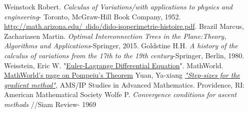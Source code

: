 \documentclass[10pt,a4paper]{article}%
\theoremstyle{theorem}
\theoremstyle{definition}
\begin{document}
\begin{thebibliography}{9}
	 Weinstock Robert. \textit{Calculus of Variations/with applications to physics and engineering}- Toronto, McGraw-Hill Book Company, 1952.
	 \href{http://math.arizona.edu/~dido/dido-isoperimetrie-histoire.pdf}{http://math.arizona.edu/~dido/dido-isoperimetrie-histoire.pdf}.
	 Brazil Marcus, Zachariasen Martin. \textit{Optimal Interconnection Trees in the Plane:Theory, Algorithms and Applications}-Springer, 2015. 
	 Goldstine H.H. \textit{A history of the calculus of variations from the 17th to the	19th century}-Springer, Berlin, 1980.
	 Weisstein, Eric W. "\href{http://mathworld.wolfram.com/Euler-LagrangeDifferentialEquation.html}{Euler-Lagrange Differential Equation}". MathWorld.
	 \href{http://mathworld.wolfram.com/PompeiusTheorem.html}{MathWorld's page on Pompeiu's Theorem}
	 Yuan, Ya-xiang \href{ftp://lsec.cc.ac.cn/pub/yyx/papers/p0504.pdf}{\textit{"Step-sizes for the gradient method"}}, AMS/IP Studies in Advanced Mathematics. Providence, RI: American Mathematical Society
	 Wolfe P. \textit{Convergence conditions for ascent methods} //Siam Review- 1969
\end{thebibliography}    
\end{document}
